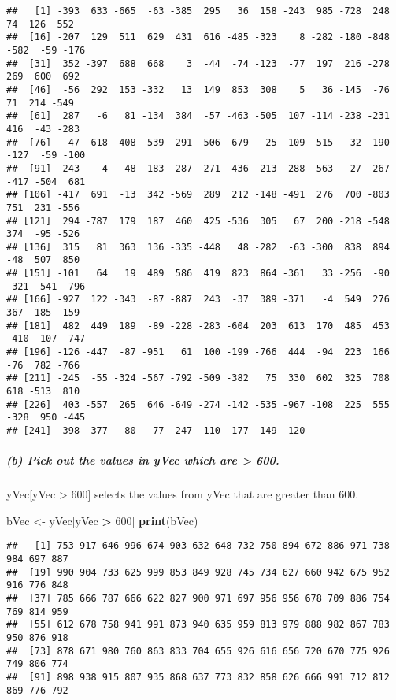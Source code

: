 \documentclass[
]{article}
\newenvironment{Shaded}{\begin{snugshade}}{\end{snugshade}}
\newcommand{\DecValTok}[1]{\textcolor[rgb]{0.00,0.00,0.81}{#1}}
\newcommand{\FunctionTok}[1]{\textcolor[rgb]{0.13,0.29,0.53}{\textbf{#1}}}
\newcommand{\NormalTok}[1]{#1}
\newcommand{\OtherTok}[1]{\textcolor[rgb]{0.56,0.35,0.01}{#1}}
\newcommand{\SpecialCharTok}[1]{\textcolor[rgb]{0.81,0.36,0.00}{\textbf{#1}}}
\begin{document}
\begin{verbatim}
##   [1] -393  633 -665  -63 -385  295   36  158 -243  985 -728  248   74  126  552
##  [16] -207  129  511  629  431  616 -485 -323    8 -282 -180 -848 -582  -59 -176
##  [31]  352 -397  688  668    3  -44  -74 -123  -77  197  216 -278  269  600  692
##  [46]  -56  292  153 -332   13  149  853  308    5   36 -145  -76   71  214 -549
##  [61]  287   -6   81 -134  384  -57 -463 -505  107 -114 -238 -231  416  -43 -283
##  [76]   47  618 -408 -539 -291  506  679  -25  109 -515   32  190 -127  -59 -100
##  [91]  243    4   48 -183  287  271  436 -213  288  563   27 -267 -417 -504  681
## [106] -417  691  -13  342 -569  289  212 -148 -491  276  700 -803  751  231 -556
## [121]  294 -787  179  187  460  425 -536  305   67  200 -218 -548  374  -95 -526
## [136]  315   81  363  136 -335 -448   48 -282  -63 -300  838  894  -48  507  850
## [151] -101   64   19  489  586  419  823  864 -361   33 -256  -90 -321  541  796
## [166] -927  122 -343  -87 -887  243  -37  389 -371   -4  549  276  367  185 -159
## [181]  482  449  189  -89 -228 -283 -604  203  613  170  485  453 -410  107 -747
## [196] -126 -447  -87 -951   61  100 -199 -766  444  -94  223  166  -76  782 -766
## [211] -245  -55 -324 -567 -792 -509 -382   75  330  602  325  708  618 -513  810
## [226]  403 -557  265  646 -649 -274 -142 -535 -967 -108  225  555 -328  950 -445
## [241]  398  377   80   77  247  110  177 -149 -120
\end{verbatim}

\subparagraph{(b) Pick out the values in yVec which are \textgreater{}
600.}\label{b-pick-out-the-values-in-yvec-which-are-600.}

yVec{[}yVec \textgreater{} 600{]} selects the values from yVec that are
greater than 600.

\begin{Shaded}
\begin{Highlighting}[]
\NormalTok{bVec }\OtherTok{\textless{}{-}}\NormalTok{ yVec[yVec }\SpecialCharTok{\textgreater{}} \DecValTok{600}\NormalTok{]}
\FunctionTok{print}\NormalTok{(bVec)}
\end{Highlighting}
\end{Shaded}

\begin{verbatim}
##   [1] 753 917 646 996 674 903 632 648 732 750 894 672 886 971 738 984 697 887
##  [19] 990 904 733 625 999 853 849 928 745 734 627 660 942 675 952 916 776 848
##  [37] 785 666 787 666 622 827 900 971 697 956 956 678 709 886 754 769 814 959
##  [55] 612 678 758 941 991 873 940 635 959 813 979 888 982 867 783 950 876 918
##  [73] 878 671 980 760 863 833 704 655 926 616 656 720 670 775 926 749 806 774
##  [91] 898 938 915 807 935 868 637 773 832 858 626 666 991 712 812 869 776 792
\end{verbatim}
\end{document}
